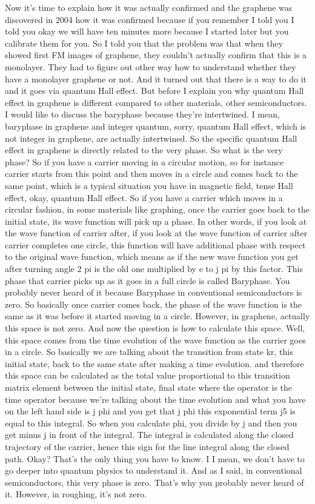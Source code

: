 Now it's time to explain how it was actually confirmed and the graphene was discovered in 2004 how it was confirmed because if you remember I told you I told you okay we will have ten minutes more because I started later but you calibrate them for you. So I told you that the problem was that when they showed first FM images of graphene, they couldn't actually confirm that this is a monolayer. They had to figure out other way how to understand whether they have a monolayer graphene or not. And it turned out that there is a way to do it and it goes via quantum Hall effect. But before I explain you why quantum Hall effect in graphene is different compared to other materials, other semiconductors. I would like to discuss the baryphase because they're intertwined. I mean, baryphase in graphene and integer quantum, sorry, quantum Hall effect, which is not integer in graphene, are actually intertwined. So the specific quantum Hall effect in graphene is directly related to the very phase. So what is the very phase? So if you have a carrier moving in a circular motion, so for instance carrier starts from this point and then moves in a circle and comes back to the same point, which is a typical situation you have in magnetic field, tense Hall effect, okay, quantum Hall effect. So if you have a carrier which moves in a circular fashion, in some materials like graphing, once the carrier goes back to the initial state, its wave function will pick up a phase. In other words, if you look at the wave function of carrier after, if you look at the wave function of carrier after carrier completes one circle, this function will have additional phase with respect to the original wave function, which means as if the new wave function you get after turning angle 2 pi is the old one multiplied by e to j pi by this factor. This phase that carrier picks up as it goes in a full circle is called Baryphase. You probably never heard of it because Baryphase in conventional semiconductors is zero. So basically once carrier comes back, the phase of the wave function is the same as it was before it started moving in a circle. However, in graphene, actually this space is not zero. And now the question is how to calculate this space. Well, this space comes from the time evolution of the wave function as the carrier goes in a circle. So basically we are talking about the transition from state kr, this initial state, back to the same state after making a time evolution. and therefore this space can be calculated as the total value proportional to this transition matrix element between the initial state, final state where the operator is the time operator because we're talking about the time evolution and what you have on the left hand side is j phi and you get that j phi this exponential term j5 is equal to this integral. So when you calculate phi, you divide by j and then you get minus j in front of the integral. The integral is calculated along the closed trajectory of the carrier, hence this sign for the line integral along the closed path. Okay? That's the only thing you have to know. I I mean, we don't have to go deeper into quantum physics to understand it. And as I said, in conventional semiconductors, this very phase is zero. That's why you probably never heard of it. However, in roughing, it's not zero. 